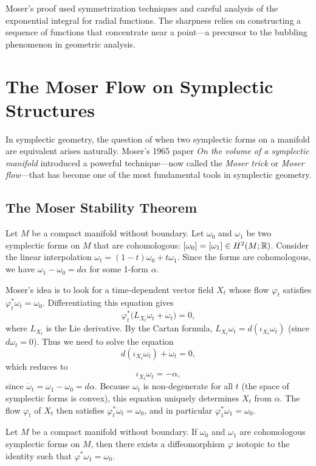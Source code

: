Moser's proof used symmetrization techniques and careful analysis of the exponential integral for radial functions. The sharpness relies on constructing a sequence of functions that concentrate near a point---a precursor to the bubbling phenomenon in geometric analysis.

\section{The Moser Flow on Symplectic Structures}

In symplectic geometry, the question of when two symplectic forms on a manifold are equivalent arises naturally. Moser's 1965 paper \textit{On the volume of a symplectic manifold} introduced a powerful technique---now called the \textit{Moser trick} or \textit{Moser flow}---that has become one of the most fundamental tools in symplectic geometry.

\subsection{The Moser Stability Theorem}

Let $M$ be a compact manifold without boundary. Let $\omega_0$ and $\omega_1$ be two symplectic forms on $M$ that are cohomologous: $[\omega_0] = [\omega_1] \in H^2(M; \mathbb{R})$. Consider the linear interpolation $\omega_t = (1-t)\omega_0 + t\omega_1$. Since the forms are cohomologous, we have $\omega_1 - \omega_0 = d\alpha$ for some 1-form $\alpha$.

Moser's idea is to look for a time-dependent vector field $X_t$ whose flow $\varphi_t$ satisfies $\varphi_t^*\omega_t = \omega_0$. Differentiating this equation gives
\[
\varphi_t^*\bigl(L_{X_t}\omega_t + \dot{\omega}_t\bigr) = 0,
\]
where $L_{X_t}$ is the Lie derivative. By the Cartan formula, $L_{X_t}\omega_t = d(\iota_{X_t}\omega_t)$ (since $d\omega_t = 0$). Thus we need to solve the equation
\[
d(\iota_{X_t}\omega_t) + \dot{\omega}_t = 0,
\]
which reduces to
\[
\iota_{X_t}\omega_t = -\alpha,
\]
since $\dot{\omega}_t = \omega_1 - \omega_0 = d\alpha$. Because $\omega_t$ is non-degenerate for all $t$ (the space of symplectic forms is convex), this equation uniquely determines $X_t$ from $\alpha$. The flow $\varphi_t$ of $X_t$ then satisfies $\varphi_t^*\omega_t = \omega_0$, and in particular $\varphi_1^*\omega_1 = \omega_0$.

\begin{theorem}
Let $M$ be a compact manifold without boundary. If $\omega_0$ and $\omega_1$ are cohomologous symplectic forms on $M$, then there exists a diffeomorphism $\varphi$ isotopic to the identity such that $\varphi^*\omega_1 = \omega_0$.
\end{theorem}


